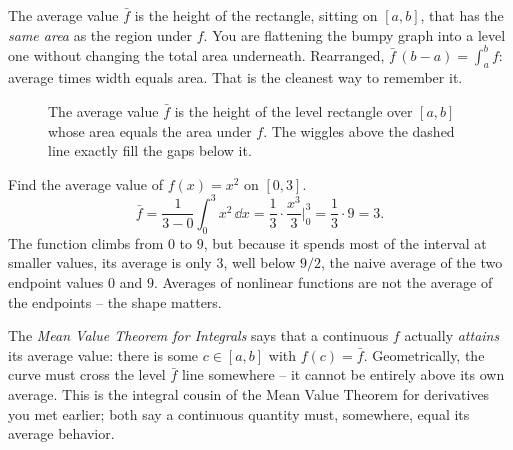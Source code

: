 \begin{intuitionbox}
The average value $\bar f$ is the height of the rectangle, sitting on $[a,b]$, that
has the \emph{same area} as the region under $f$. You are flattening the bumpy
graph into a level one without changing the total area underneath. Rearranged,
$\bar f\,(b-a) = \int_a^b f$: average times width equals area. That is the cleanest
way to remember it.
\end{intuitionbox}

\begin{figure}[H]
\centering
{}
\caption{The average value $\bar f$ is the height of the level rectangle over
$[a,b]$ whose area equals the area under $f$. The wiggles above the dashed line
exactly fill the gaps below it.}
\label{ch26:fig-average}
\end{figure}

\begin{example}
\label{ch26:ex-average}
Find the average value of $f(x) = x^2$ on $[0,3]$.
\[
  \bar f = \frac{1}{3-0}\int_0^3 x^2\,\dd x
         = \frac13\cdot\frac{x^3}{3}\Big|_0^3
         = \frac13\cdot 9 = 3.
\]
The function climbs from $0$ to $9$, but because it spends most of the interval at
smaller values, its average is only $3$, well below $9/2$, the naive average of the
two endpoint values $0$ and $9$. Averages of nonlinear functions are not the average
of the endpoints -- the shape matters.
\end{example}

\begin{connectionbox}
The \emph{Mean Value Theorem for Integrals} says that a continuous $f$ actually
\emph{attains} its average value: there is some $c\in[a,b]$ with $f(c)=\bar f$.
Geometrically, the curve must cross the level $\bar f$ line somewhere -- it cannot
be entirely above its own average. This is the integral cousin of the Mean Value
Theorem for derivatives you met earlier; both say a continuous quantity must,
somewhere, equal its average behavior.
\end{connectionbox}

